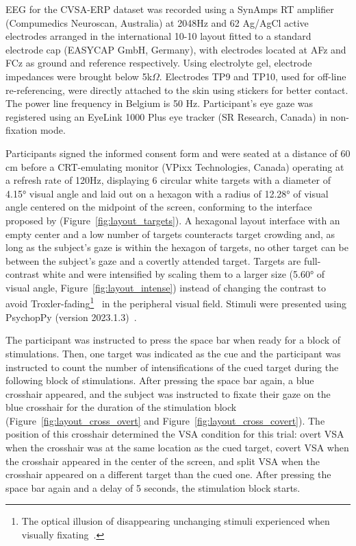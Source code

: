 EEG for the CVSA-ERP dataset was recorded using a SynAmps RT amplifier
(Compumedics Neuroscan, Australia) at 2048Hz and 62 Ag/AgCl active electrodes arranged in the
international 10-10 layout fitted to a standard electrode cap (EASYCAP GmbH,
Germany), with electrodes located at AFz and FCz as ground and reference respectively.
Using electrolyte gel, electrode impedances were brought below 5k$\Omega$.
Electrodes TP9 and TP10, used for off-line re-referencing, were directly
attached to the skin using stickers for better contact.
The power line frequency in Belgium is 50 Hz.
Participant's eye gaze was registered using an EyeLink 1000 Plus eye tracker (SR Research,
Canada) in non-fixation mode.

Participants signed the informed consent form and were seated at a distance of
60 cm before a CRT-emulating monitor (VPixx
Technologies, Canada) operating at a refresh rate of 120Hz, displaying 6
circular white targets with a diameter of 4.15° visual angle and laid out on a hexagon
with a radius of 12.28° of visual angle centered on the midpoint of the screen,
conforming to the interface proposed by \textcite{Treder2010}
(Figure~\ref{fig:layout_targets}).
A hexagonal layout interface with an empty center and a low number of targets
counteracts target crowding and, as long as the subject’s gaze is within the hexagon of
targets, no other target can be between the subject’s gaze and a covertly
attended target.
Targets are full-contrast white and were intensified by scaling them to a
larger size (5.60° of visual angle, Figure~\ref{fig:layout_intense}) instead of changing the contrast to avoid Troxler-fading\footnote{The optical illusion of disappearing unchanging stimuli
experienced when visually fixating~\cite{Troxler1804}.}~\cite{Treder2010} in the
peripheral visual field.
Stimuli were presented using PsychopPy (version 2023.1.3)~\cite{Peirce2019}.

The participant was instructed to press the space bar when ready for a block
of stimulations.
Then, one target was indicated as the cue and the participant
was instructed to count the number of intensifications of the cued target
during the following block of stimulations.
After pressing the space bar again, a blue crosshair appeared, and the subject
was instructed to fixate their gaze on the blue crosshair for the duration of
the stimulation block (Figure~\ref{fig:layout_cross_overt} and Figure~\ref{fig:layout_cross_covert}).
The position of this crosshair determined the VSA condition for this trial:
overt VSA when the crosshair was at the same location as the cued target,
covert VSA when the crosshair appeared in the center of the screen, and split
VSA when the crosshair appeared on a different target than the cued one.
After pressing the space bar again and a delay of 5 seconds, the stimulation block
starts.

